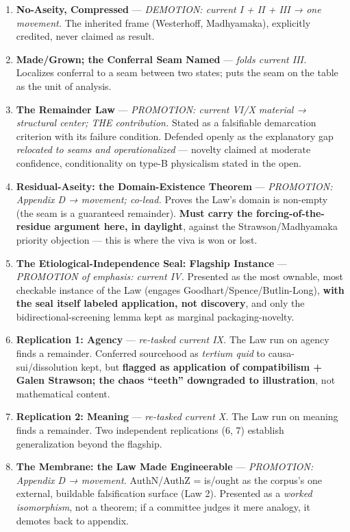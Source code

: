 \documentclass[11pt]{article}
\begin{document}
\begin{enumerate}
\item \textbf{No-Aseity, Compressed} — \emph{DEMOTION: current I + II + III → one movement.} The inherited frame (Westerhoff, Madhyamaka), explicitly credited, never claimed as result.
\item \textbf{Made/\allowbreak{}Grown; the Conferral Seam Named} — \emph{folds current III.} Localizes conferral to a seam between two states; puts the seam on the table as the unit of analysis.
\item \textbf{The Remainder Law} — \emph{PROMOTION: current VI/\allowbreak{}X material → structural center; THE contribution.} Stated as a falsifiable demarcation criterion with its failure condition. Defended openly as the explanatory gap \emph{relocated to seams and operationalized} — novelty claimed at moderate confidence, conditionality on type-B physicalism stated in the open.
\item \textbf{Residual-Aseity: the Domain-Existence Theorem} — \emph{PROMOTION: Appendix D → movement; co-lead.} Proves the Law's domain is non-empty (the seam is a guaranteed remainder). \textbf{Must carry the forcing-of-the-residue argument here, in daylight}, against the Strawson/\allowbreak{}Madhyamaka priority objection — this is where the viva is won or lost.
\item \textbf{The Etiological-Independence Seal: Flagship Instance} — \emph{PROMOTION of emphasis: current IV.} Presented as the most ownable, most checkable instance of the Law (engages Goodhart/\allowbreak{}Spence/\allowbreak{}Butlin-Long), \textbf{with the seal itself labeled application, not discovery}, and only the bidirectional-screening lemma kept as marginal packaging-novelty.
\item \textbf{Replication 1: Agency} — \emph{re-tasked current IX.} The Law run on agency finds a remainder. Conferred sourcehood as \emph{tertium quid} to causa-sui/\allowbreak{}dissolution kept, but \textbf{flagged as application of compatibilism + Galen Strawson; the chaos ``teeth'' downgraded to illustration}, not mathematical content.
\item \textbf{Replication 2: Meaning} — \emph{re-tasked current X.} The Law run on meaning finds a remainder. Two independent replications (6, 7) establish generalization beyond the flagship.
\item \textbf{The Membrane: the Law Made Engineerable} — \emph{PROMOTION: Appendix D → movement.} AuthN/\allowbreak{}AuthZ = is/\allowbreak{}ought as the corpus's one external, buildable falsification surface (Law 2). Presented as a \emph{worked isomorphism}, not a theorem; if a committee judges it mere analogy, it demotes back to appendix.

\end{enumerate}
\end{document}
